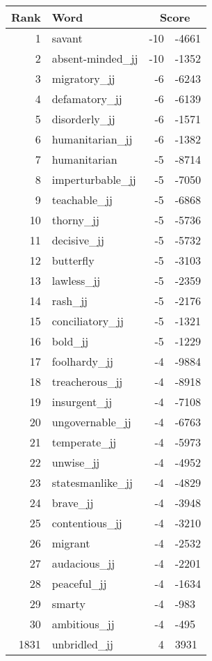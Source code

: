 \begin{longtable}[!htbp]{| rlr@{.}l |}
    \hline
    \textbf{Rank} & \textbf{Word} & \multicolumn{2}{c|}{\textbf{Score}} \\
    \hline
    \endhead
    1 & savant & -10 & -4661 \\
    2 & absent-minded\_jj & -10 & -1352 \\
    3 & migratory\_jj & -6 & -6243 \\
    4 & defamatory\_jj & -6 & -6139 \\
    5 & disorderly\_jj & -6 & -1571 \\
    6 & humanitarian\_jj & -6 & -1382 \\
    7 & humanitarian & -5 & -8714 \\
    8 & imperturbable\_jj & -5 & -7050 \\
    9 & teachable\_jj & -5 & -6868 \\
    10 & thorny\_jj & -5 & -5736 \\
    11 & decisive\_jj & -5 & -5732 \\
    12 & butterfly & -5 & -3103 \\
    13 & lawless\_jj & -5 & -2359 \\
    14 & rash\_jj & -5 & -2176 \\
    15 & conciliatory\_jj & -5 & -1321 \\
    16 & bold\_jj & -5 & -1229 \\
    17 & foolhardy\_jj & -4 & -9884 \\
    18 & treacherous\_jj & -4 & -8918 \\
    19 & insurgent\_jj & -4 & -7108 \\
    20 & ungovernable\_jj & -4 & -6763 \\
    21 & temperate\_jj & -4 & -5973 \\
    22 & unwise\_jj & -4 & -4952 \\
    23 & statesmanlike\_jj & -4 & -4829 \\
    24 & brave\_jj & -4 & -3948 \\
    25 & contentious\_jj & -4 & -3210 \\
    26 & migrant & -4 & -2532 \\
    27 & audacious\_jj & -4 & -2201 \\
    28 & peaceful\_jj & -4 & -1634 \\
    29 & smarty & -4 & -983 \\
    30 & ambitious\_jj & -4 & -495 \\
    1831 & unbridled\_jj & 4 & 3931 \\

\end{longtable}
